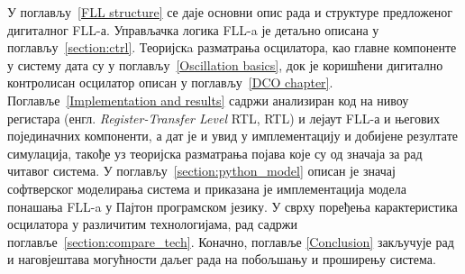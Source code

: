 \documentclass[master]{finthesis}
\makeatletter
\newcommand*{\engl}[2][\@empty]{%
    \edef\theacronym{#1}%
    (енгл. \foreignlanguage{english}{\emph{#2}%
    \ifx\theacronym\@empty \else , #1\fi})%
}
\def \FLL  {FLL} %
\makeatother
\begin{document}
У поглављу~\ref{FLL structure} се даје основни опис рада и структуре предложеног дигиталног \FLL-а. Управљачка логика \FLL-a је детаљно описана у поглављу~\ref{section:ctrl}. Теоријскa разматрања осцилатора, као главне компоненте у систему дата су у поглављу~\ref{Oscillation basics}, док је коришћени дигитално контролисан осцилатор описан у поглављу~\ref{DCO chapter}. Поглавље~\ref{Implementation and results} садржи анализиран код на нивоу регистара \engl[RTL]{Register-Transfer Level} и лејаут \FLL-а и његових појединачних компоненти, а дат је и увид у имплементацију и добијене резултате симулација, такође уз теоријска разматрања појава које су од значаја за рад читавог система. У поглављу~\ref{section:python_model} описан је значај софтверског моделирања система и приказана је имплементација модела понашања \FLL-a у Пајтон програмском језику. У сврху поређења карактеристика осцилатора у различитим технологијама, рад садржи поглавље~\ref{section:compare_tech}. Коначно, поглавље \ref{Conclusion} закључује рад и наговјештава могућности даљег рада на побољшању и проширењу система.
\end{document}
